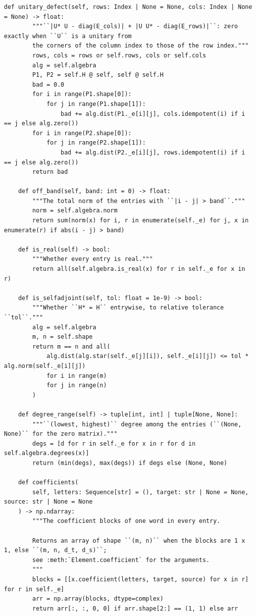 \documentclass[12pt, a4paper]{report}
\theoremstyle{plain}
\theoremstyle{definition}
\theoremstyle{remark}
\theoremstyle{plain}
\begin{document}
\begin{lstlisting}[style=dsqcode]
    def unitary_defect(self, rows: Index | None = None, cols: Index | None = None) -> float:
        """``|U* U - diag(E_cols)| + |U U* - diag(E_rows)|``: zero exactly when ``U`` is a unitary from
        the corners of the column index to those of the row index."""
        rows, cols = rows or self.rows, cols or self.cols
        alg = self.algebra
        P1, P2 = self.H @ self, self @ self.H
        bad = 0.0
        for i in range(P1.shape[0]):
            for j in range(P1.shape[1]):
                bad += alg.dist(P1._e[i][j], cols.idempotent(i) if i == j else alg.zero())
        for i in range(P2.shape[0]):
            for j in range(P2.shape[1]):
                bad += alg.dist(P2._e[i][j], rows.idempotent(i) if i == j else alg.zero())
        return bad

    def off_band(self, band: int = 0) -> float:
        """The total norm of the entries with ``|i - j| > band``."""
        norm = self.algebra.norm
        return sum(norm(x) for i, r in enumerate(self._e) for j, x in enumerate(r) if abs(i - j) > band)

    def is_real(self) -> bool:
        """Whether every entry is real."""
        return all(self.algebra.is_real(x) for r in self._e for x in r)

    def is_selfadjoint(self, tol: float = 1e-9) -> bool:
        """Whether ``H* = H`` entrywise, to relative tolerance ``tol``."""
        alg = self.algebra
        m, n = self.shape
        return m == n and all(
            alg.dist(alg.star(self._e[j][i]), self._e[i][j]) <= tol * alg.norm(self._e[i][j])
            for i in range(m)
            for j in range(n)
        )

    def degree_range(self) -> tuple[int, int] | tuple[None, None]:
        """``(lowest, highest)`` degree among the entries (``(None, None)`` for the zero matrix)."""
        degs = [d for r in self._e for x in r for d in self.algebra.degrees(x)]
        return (min(degs), max(degs)) if degs else (None, None)

    def coefficients(
        self, letters: Sequence[str] = (), target: str | None = None, source: str | None = None
    ) -> np.ndarray:
        """The coefficient blocks of one word in every entry.

        Returns an array of shape ``(m, n)`` when the blocks are 1 x 1, else ``(m, n, d_t, d_s)``;
        see :meth:`Element.coefficient` for the arguments.
        """
        blocks = [[x.coefficient(letters, target, source) for x in r] for r in self._e]
        arr = np.array(blocks, dtype=complex)
        return arr[:, :, 0, 0] if arr.shape[2:] == (1, 1) else arr


\end{lstlisting}
\end{document}
